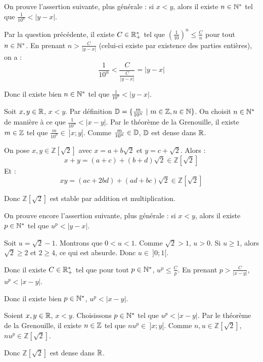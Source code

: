 \documentclass[]{../templates/homework}
\begin{document}
\subproblem
\question On prouve l'assertion suivante, plus générale : si $x < y$, alors il existe $n\in\mathbb N^*$ tel que $\frac 1 {10^n} < |y-x|$. 

Par la question précédente, il existe $C\in\mathbb R_+^*$ tel que $\left(\frac 1 {10}\right)^n \leq \frac C n$ pour tout $n\in\mathbb N^*$. En prenant $n > \frac C {|y-x|}$ (celui-ci existe par existence des parties entières), on a : $$\frac 1 {10^n} < \frac C {\frac C {|y-x|}} = |y-x|$$

Donc il existe bien $n \in \mathbb N^*$ tel que $\frac 1 {10^n} < |y-x|$.

\question Soit $x,y\in\mathbb R$, $x<y$. Par définition $\D = \{\frac m {10^n}\ |\ m\in\Z, n\in\N\}$. On choisit $n\in\mathbb N^*$ de manière à ce que $\frac 1 {10^n} < |x-y|$. Par le théorème de la Grenouille, il existe $m\in\mathbb Z$ tel que $\frac m {10^n} \in\ ]x;y[$. Comme $\frac m {10^n} \in \mathbb D$, $\mathbb D$ est dense dans $\mathbb R$.


\subproblem
\newcommand{\Ztwo}{\mathbb Z[\sqrt 2]}
\question On pose $x,y \in \Ztwo$ avec $x = a + b\sqrt2$ et $y = c+\sqrt 2$. Alors :
\begin{equation*}
	x+y = (a+c) + (b+d)\sqrt 2 \in \Ztwo
\end{equation*}
Et :
\begin{equation*}
	xy = (ac+2bd) + (ad + bc)\sqrt 2 \in \Ztwo
\end{equation*}

Donc $\Ztwo$ est stable par addition et multiplication.

\question On prouve encore l'assertion suivante, plus générale : si $x < y$, alors il existe $p\in\mathbb N^*$ tel que $u^p < |y-x|$. 

 Soit $u = \sqrt 2 -1$. Montrons que $0<u<1$. Comme $\sqrt 2 > 1$, $u>0$. Si $u \geq 1$, alors $\sqrt 2 \geq 2$ et $2 \geq 4$, ce qui est absurde. Donc $u\in\ ]0;1[$.

Donc il existe $C \in \mathbb R_+^*$ tel que pour tout $p\in\mathbb N^*$, $u^p \leq \frac C p$. En prenant $p > \frac C {|x-y|}$, $u^p < |x-y|$.

Donc il existe bien $p\in\mathbb N^*$, $u^p < |x-y|$.

\question Soient $x,y\in\mathbb R$, $x<y$. Choisissons $p\in\mathbb N^*$ tel que $u^p < |x-y|$. Par le théorème de la Grenouille, il existe $n\in\mathbb Z$ tel que $nu^p \in\ ]x;y[$. Comme $n,u\in\Ztwo$, $nu^p\in\Ztwo$. 

Donc $\Ztwo$ est dense dans $\mathbb R$.
\end{document}
